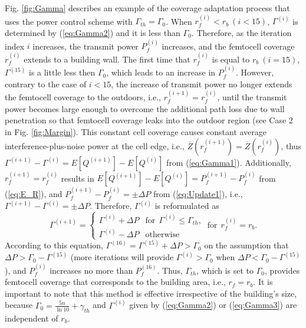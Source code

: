 \documentclass[draftclsnofoot,12pt,onecolumn]{IEEEtran}
\begin{document}
Fig. \ref{fig:Gamma} describes an example of the coverage adaptation
process that uses the power control scheme with
$\Gamma_{th}=\Gamma_0$. When $r_f^{(i)}<r_b~(i<15)$, $\Gamma^{(i)}$
is determined by (\ref{eq:Gamma2}) and it is less than $\Gamma_0$.
Therefore, as the iteration index $i$ increases, the transmit power
$P_f^{(i)}$ increases, and the femtocell coverage $r_f^{(i)}$
extends to a building wall. The first time that $r_f^{(i)}$ is equal
to $r_b~(i=15)$, $\Gamma^{(15)}$ is a little less then $\Gamma_0$,
which leads to an increase in $P_f^{(i)}$. However, contrary to the
case of $i<15$, the increase of transmit power no longer extends the
femtocell coverage to the outdoors, i.e., $r_f^{(i+1)}=r_f^{(i)}$,
until the transmit power becomes large enough to overcome the
additional path loss due to wall penetration so that femtocell
coverage leaks into the outdoor region (see Case 2 in Fig.
\ref{fig:Margin}). This constant cell coverage causes constant average interference-plus-noise power at the cell edge, i.e.,
$\overline{Z}(r_f^{(i+1)})=\overline{Z}(r_f^{(i)})$, thus
$\Gamma^{(i+1)}-\Gamma^{(i)}=E[Q^{(i+1)}]-E[Q^{(i)}]$ from
(\ref{eq:Gamma1}). Additionally, $r_f^{(i+1)}=r_f^{(i)}$ results in
$E[Q^{(i+1)}]-E[Q^{(i)}]=P_f^{(i+1)}-P_f^{(i)}$ from (\ref{eq:E_R}),
and $P_f^{(i+1)}-P_f^{(i)}=\pm\Delta P$ from (\ref{eq:Update1}),
i.e., $\Gamma^{(i+1)}-\Gamma^{(i)}=\pm\Delta P$. Therefore,
$\Gamma^{(i)}$ is reformulated as
\begin{equation}
\Gamma^{(i+1)} =\left\{
                     \begin{array}{ll}
                       \Gamma^{(i)}+\Delta P & \textrm{for}~~\Gamma^{(i)}\leq\Gamma_{th},\\
                       \Gamma^{(i)}-\Delta P &
                       \textrm{otherwise}
                     \end{array}\right. ~\textrm{for}~~r_f^{(i)}=r_b.\label{eq:Gamma3}
\end{equation}
According to this equation, $\Gamma^{(16)}=\Gamma^{(15)}+\Delta
P>\Gamma_0$ on the assumption that $\Delta P>\Gamma_0-\Gamma^{(15)}$
(more iterations will provide $\Gamma^{(i)}>\Gamma_0$ when $\Delta
P<\Gamma_0-\Gamma^{(15)}$), and $P_f^{(i)}$ increases no more than
$P_f^{(16)}$. Thus, $\Gamma_{th}$, which is set to $\Gamma_0$, provides
femtocell coverage that corresponds to the building area, i.e.,
$r_f=r_b$. It is important to note that this method is
effective irrespective of the building's size, because $\Gamma_0=\frac{5n}{\ln10}+\gamma_{th}$ and
$\Gamma^{(i)}$ given by (\ref{eq:Gamma2}) or
(\ref{eq:Gamma3}) are independent of $r_b$.
\end{document}

